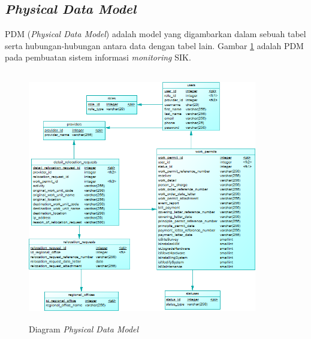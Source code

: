 \subsection{\textit{Physical Data Model}}
PDM (\textit{Physical Data Model}) adalah model yang digambarkan dalam sebuah tabel serta hubungan-hubungan antara data dengan tabel lain. Gambar \ref{figure:PDM} adalah PDM pada pembuatan sistem informasi \textit{monitoring} SIK.
	\begin{figure}[h!]
	\centerline
	{\includegraphics[width=10cm,height=11cm]{bab4/PDM.png}}
	\caption{Diagram \textit{Physical Data Model}}
	\label{figure:PDM}
	\end{figure}